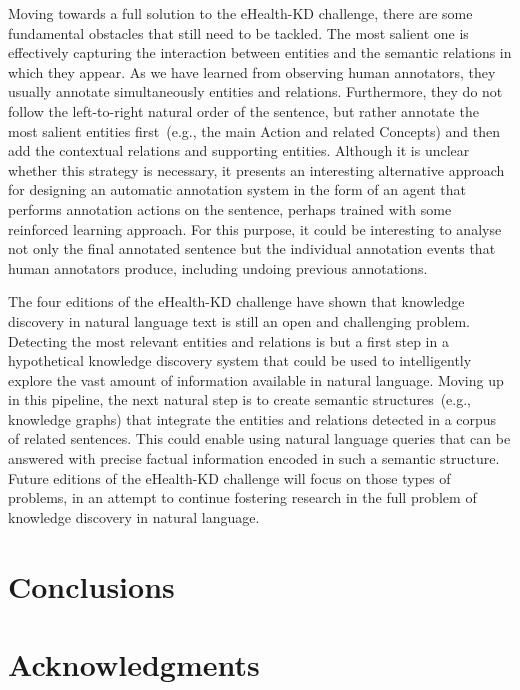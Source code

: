 \documentclass[a4paper,11pt,twocolumn,twoside]{article}
\begin{document}
Moving towards a full solution to the eHealth-KD challenge, there are some fundamental obstacles that still need to be tackled.
The most salient one is effectively capturing the interaction between entities and the semantic relations in which they appear.
As we have learned from observing human annotators, they usually annotate simultaneously entities and relations.
Furthermore, they do not follow the left-to-right natural order of the sentence, but rather annotate the most salient entities first~(e.g., the main Action and related Concepts) and then add the contextual relations and supporting entities.
Although it is unclear whether this strategy is necessary, it presents an interesting alternative approach for designing an automatic annotation system in the form of an agent that performs annotation actions on the sentence, perhaps trained with some reinforced learning approach.
For this purpose, it could be interesting to analyse not only the final annotated sentence but the individual annotation events that human annotators produce, including undoing previous annotations.

The four editions of the eHealth-KD challenge have shown that knowledge discovery in natural language text is still an open and challenging problem.
Detecting the most relevant entities and relations is but a first step in a hypothetical knowledge discovery system that could be used to intelligently explore the vast amount of information available in natural language.
Moving up in this pipeline, the next natural step is to create semantic structures~(e.g., knowledge graphs) that integrate the entities and relations detected in a corpus of related sentences.
This could enable using natural language queries that can be answered with precise factual information encoded in such a semantic structure.
Future editions of the eHealth-KD challenge will focus on those types of problems, in an attempt to continue fostering research in the full problem of knowledge discovery in natural language.

\section{Conclusions}\label{sec:conclusions}

\section*{Acknowledgments}



\end{document}
